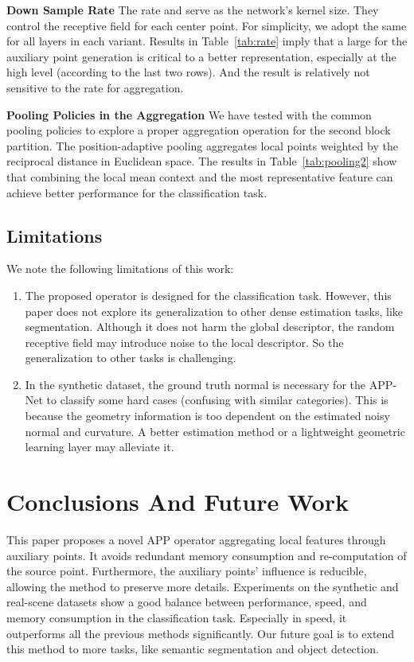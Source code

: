 \documentclass[journal]{IEEEtran}
\begin{document}
\noindent
{\bf Down Sample Rate}
The rate  and  serve as the network's kernel size. They control the receptive field for each center point. For simplicity, we adopt the same  for all layers in each variant. Results in Table~\ref{tab:rate} imply that a large  for the auxiliary point generation is critical to a better representation, especially at the high level (according to the last two rows). And the result is relatively not sensitive to the rate  for aggregation.





\noindent
{\bf Pooling Policies in the Aggregation}
We have tested with the common pooling policies to explore a proper aggregation operation for the second block partition. The position-adaptive pooling aggregates local points weighted by the reciprocal distance in Euclidean space. The results in Table~\ref{tab:pooling2} show that combining the local mean context and the most representative feature can achieve better performance for the classification task.


\subsection{Limitations}

We note the following limitations of this work:

\begin{enumerate}
    \item The proposed operator is designed for the classification task. However, this paper does not explore its generalization to other dense estimation tasks, like segmentation. Although it does not harm the global descriptor,  the random receptive field may introduce noise to the local descriptor. So the generalization to other tasks is challenging.
    \item In the synthetic dataset, the ground truth normal is necessary for the APP-Net to classify some hard cases (confusing with similar categories). This is because the geometry information is too dependent on the estimated noisy normal and curvature. A better estimation method or a lightweight geometric learning layer may alleviate it. 
    
    
\end{enumerate}


\section{Conclusions And Future Work}
This paper proposes a novel APP operator aggregating local features through auxiliary points. It avoids redundant memory consumption and re-computation of the source point. Furthermore, the auxiliary points' influence is reducible, allowing the method to preserve more details. Experiments on the synthetic and real-scene datasets show a good balance between performance, speed, and memory consumption in the classification task. Especially in speed, it outperforms all the previous methods significantly. Our future goal is to extend this method to more tasks, like semantic segmentation and object detection.
\end{document}
